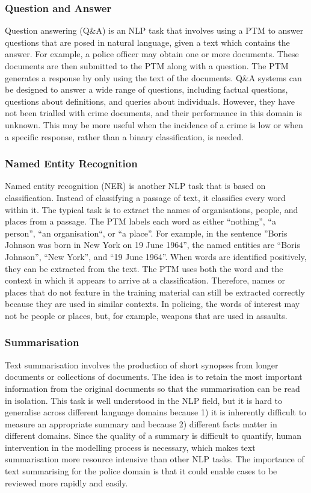 \subsubsection{Question and Answer} Question answering (Q\&A) is an NLP task that involves using a PTM to answer questions that are posed in natural language, given a text which contains the answer. For example, a police officer may obtain one or more documents. These documents are then submitted to the PTM along with a question. The PTM generates a response by only using the text of the documents. Q\&A systems can be designed to answer a wide range of questions, including factual questions, questions about definitions, and queries about individuals. However, they have not been trialled with crime documents, and their performance in this domain is unknown. This may be more useful when the incidence of a crime is low or when a specific response, rather than a binary classification, is needed.

\subsubsection{Named Entity Recognition} Named entity recognition (NER) is another NLP task that is based on classification. Instead of classifying a passage of text, it classifies every word within it. The typical task is to extract the names of organisations, people, and places from a passage. The PTM labels each word as either “nothing”, “a person”, “an organisation“, or “a place”. For example, in the sentence ”Boris Johnson was born in New York on 19 June 1964”, the named entities are “Boris Johnson”, “New York”, and “19 June 1964”. When words are identified positively, they can be extracted from the text. The PTM uses both the word and the context in which it appears to arrive at a classification. Therefore, names or places that do not feature in the training material can still be extracted correctly because they are used in similar contexts. In policing, the words of interest may not be people or places, but, for example, weapons that are used in assaults. 


\subsubsection{Summarisation} Text summarisation involves the production of short synopses from longer documents or collections of documents. The idea is to retain the most important information from the original documents so that the summarisation can be read in isolation. This task is well understood in the NLP field, but it is hard to generalise across different language domains because 1) it is inherently difficult to measure an appropriate summary and because 2) different facts matter in different domains. Since the quality of a summary is difficult to quantify, human intervention in the modelling process is necessary, which makes text summarisation more resource intensive than other NLP tasks. The importance of text summarising for the police domain is that it could enable cases to be reviewed more rapidly and easily. 

